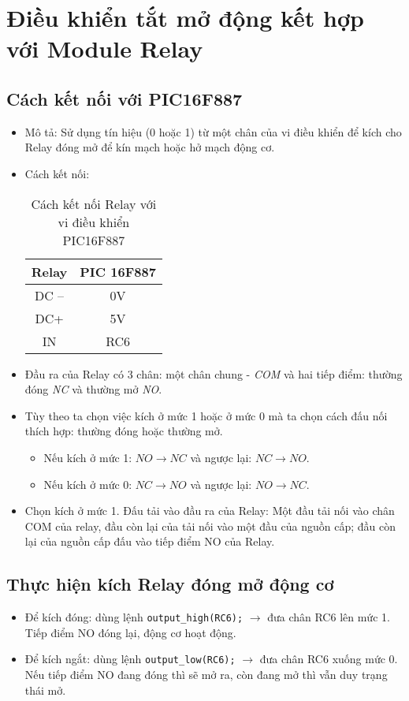 \section{Điều khiển tắt mở động kết hợp với Module Relay}
\subsection{Cách kết nối với PIC16F887}
\begin{itemize}
\item Mô tả: Sử dụng tín hiệu (0 hoặc 1) từ một chân của vi điều khiển để kích cho Relay đóng mở để kín mạch hoặc hở mạch động cơ.
\item Cách kết nối:
\begin{table}[h]
\begin{center}
\begin{tabular}{|c|c|}\hline
\textbf{Relay} & \textbf{PIC 16F887} \\ \hline
DC -- & 0V \\ \hline
DC+ & 5V \\ \hline
IN & RC6 \\ \hline
\end{tabular}
\end{center}
\caption{Cách kết nối Relay với vi điều khiển PIC16F887}
\end{table}
\item Đầu ra của Relay có 3 chân: một chân chung - \textit{COM} và hai tiếp điểm: thường đóng \textit{NC} và thường mở \textit{NO}.
\item Tùy theo ta chọn việc kích ở mức 1 hoặc ở mức 0 mà ta chọn cách đấu nối thích hợp: thường đóng hoặc thường mở.
\begin{itemize}
\item Nếu kích ở mức 1: $NO \longrightarrow NC$ và ngược lại: $NC \longrightarrow NO$.
\item Nếu kích ở mức 0: $NC \longrightarrow NO$ và ngược lại: $NO \longrightarrow NC$.
\end{itemize}
\item Chọn kích ở mức 1. Đấu tải vào đầu ra của Relay: Một đầu tải nối vào chân COM của relay, đầu còn lại của tải nối vào một đầu của nguồn cấp; đầu còn lại của nguồn cấp đấu vào tiếp điểm NO của Relay.
\end{itemize}
\subsection{Thực hiện kích Relay đóng mở động cơ}
\begin{itemize}
\item Để kích đóng: dùng lệnh \verb|output_high(RC6);| $\longrightarrow$ đưa chân RC6 lên mức 1. Tiếp điểm NO đóng lại, động cơ hoạt động.
\item Để kích ngắt: dùng lệnh \verb|output_low(RC6);| $\longrightarrow$ đưa chân RC6 xuống mức 0. Nếu tiếp điểm NO đang đóng thì sẽ mở ra, còn đang mở thì vẫn duy trạng thái mở.
\end{itemize}